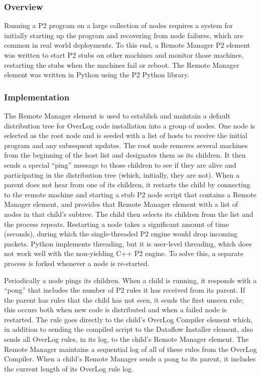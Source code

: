 \documentclass[12pt]{article}
\begin{document}
\subsubsection{Overview}
Running a P2 program on a large collection of nodes requires a system for initially starting
up the program and recovering from node failures, which are common in real world deployments. 
To this end, a Remote Manager P2 element was written to 
start P2 stubs on other machines and monitor those machines, restarting the stubs when the 
machines fail or reboot.  The Remote Manager element was written in Python using the P2 Python 
library.

\subsubsection{Implementation}

The Remote Manager element is used to establish and maintain a default distribution tree 
for OverLog code installation into a group of nodes.  One node is selected as the 
root node and is seeded with a list of hosts to receive the initial program and any 
subsequent updates.  The root node removes
several machines from the beginning of the host list and designates them as its children.
It then sends a special ``ping'' message to those children to see if they are alive and 
participating in the distribution
tree (which, initially, they are not).  When a parent does not hear from one of its children,
it restarts the child by connecting to the remote machine and starting a stub P2 node script 
that contains a Remote Manager element, and provides that Remote Manager element with a 
list of nodes in that child's subtree.  The child then selects its children from the list 
and the process repeats.  Restarting a node takes a significant amount of time (seconds), 
during which the single-threaded P2 engine would drop incoming packets.  Python implements
threading, but it is user-level threading, which does not work well with the non-yielding 
C++ P2 engine.  To solve this, a separate process is forked whenever a node is re-started.


Periodically a node pings its children.  When a child is running, it responds with a ``pong''
that includes the number of P2 rules it has received from its parent.  If the parent has 
rules that the child has not seen, it sends the first unseen rule; this occurs both when 
new code is distributed and when a failed node is restarted.  The rule goes directly 
to the child's OverLog Compiler element which, in addition to sending the compiled script 
to the Dataflow Installer 
element, also sends all OverLog rules, in its log, to the child's Remote Manager element.  The 
Remote Manager maintains a sequential log of all of these rules from the OverLog Compiler.
When a child's Remote Manager sends a pong to its parent, it includes the current length 
of its OverLog rule log.
\end{document}
